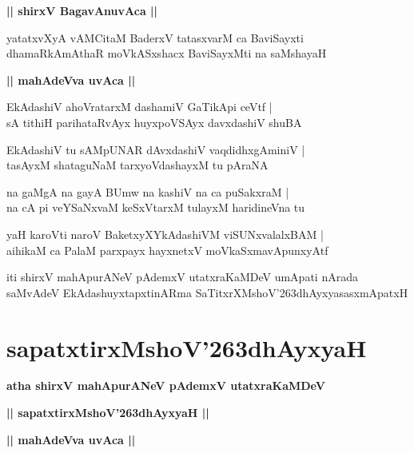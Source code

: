 \documentclass[twoside,12pt,openright]{book}
\def\S{\char'263}
\newcounter{shloka}[chapter]
\def\uvaca#1{\centerline{{\large\textbf{#1}}}}
\begin{document}
\uvaca{|| shirxV BagavAnuvAca ||}

\begin{shloka}%
yatatxvXyA vAMCitaM BaderxV tatasxvarM ca BaviSayxti \\
dhamaRkAmAthaR moVkASxshacx BaviSayxMti na saMshayaH
\end{shloka}

\uvaca{|| mahAdeVva uvAca ||}

\begin{shloka}%
EkAdashiV ahoVratarxM dashamiV GaTikApi ceVtf |\\
sA tithiH parihataRvAyx huyxpoVSAyx davxdashiV shuBA
\end{shloka}

\begin{shloka}%
EkAdashiV tu sAMpUNAR dAvxdashiV vaqdidhxgAminiV |\\
tasAyxM shataguNaM tarxyoVdashayxM tu pAraNA
\end{shloka}

\begin{shloka}%
na gaMgA na gayA BUmw na kashiV na ca puSakxraM |\\
na cA pi veYSaNxvaM keSxVtarxM tulayxM haridineVna tu
\end{shloka}

\begin{shloka}%
yaH karoVti naroV BaketxyXYkAdashiVM viSUNxvalalxBAM |\\
aihikaM ca PalaM parxpayx hayxnetxV moVkaSxmavApunxyAtf
\end{shloka}

\begin{center}
iti shirxV mahApurANeV pAdemxV utatxraKaMDeV umApati nArada saMvAdeV  
EkAdashuyxtapxtinARma SaTitxrXMshoV\S dhAyxyasasxmApatxH 
\end{center}

\chapter{sapatxtirxMshoV\S dhAyxyaH}

\begin{center}
{\LARGE\bfseries atha shirxV mahApurANeV pAdemxV utatxraKaMDeV}
\end{center}

\begin{center}
{\LARGE\bfseries || sapatxtirxMshoV\S dhAyxyaH ||}
\end{center}

\uvaca{|| mahAdeVva uvAca ||}
\end{document}
